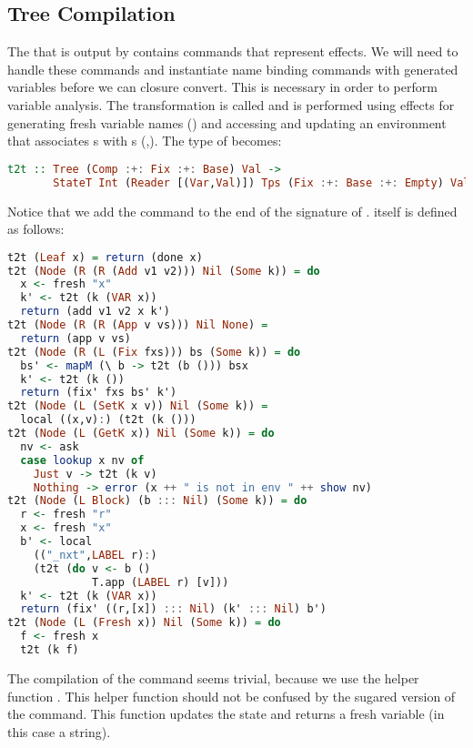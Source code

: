 \subsection{\label{subsection:semtosyn}Tree Compilation}
The  that is output by  contains commands that represent effects. We will need to handle these commands and instantiate name binding commands with generated variables before we can closure convert. This is necessary in order to perform variable analysis. The transformation is called  and is performed using effects for generating fresh variable names () and accessing and updating an environment that associates s with s (,). The type of  becomes:

\begin{lstlisting}[language=Haskell]
t2t :: Tree (Comp :+: Fix :+: Base) Val ->
       StateT Int (Reader [(Var,Val)]) Tps (Fix :+: Base :+: Empty) Val
\end{lstlisting}

Notice that we add the  command to the end of the signature of .  itself is defined as follows:

\begin{lstlisting}[language=Haskell]
t2t (Leaf x) = return (done x)
t2t (Node (R (R (Add v1 v2))) Nil (Some k)) = do
  x <- fresh "x"
  k' <- t2t (k (VAR x))
  return (add v1 v2 x k')
t2t (Node (R (R (App v vs))) Nil None) =
  return (app v vs)
t2t (Node (R (L (Fix fxs))) bs (Some k)) = do
  bs' <- mapM (\ b -> t2t (b ())) bsx
  k' <- t2t (k ())
  return (fix' fxs bs' k')
t2t (Node (L (SetK x v)) Nil (Some k)) =
  local ((x,v):) (t2t (k ()))
t2t (Node (L (GetK x)) Nil (Some k)) = do
  nv <- ask
  case lookup x nv of
    Just v -> t2t (k v)
    Nothing -> error (x ++ " is not in env " ++ show nv)
t2t (Node (L Block) (b ::: Nil) (Some k)) = do
  r <- fresh "r"
  x <- fresh "x"
  b' <- local
    (("_nxt",LABEL r):)
    (t2t (do v <- b ()
             T.app (LABEL r) [v]))
  k' <- t2t (k (VAR x))
  return (fix' ((r,[x]) ::: Nil) (k' ::: Nil) b')
t2t (Node (L (Fresh x)) Nil (Some k)) = do
  f <- fresh x
  t2t (k f)
\end{lstlisting}

The compilation of the  command seems trivial, because we use the helper function . This helper function should not be confused by the sugared version of the  command. This function updates the state and returns a fresh variable (in this case a string).

